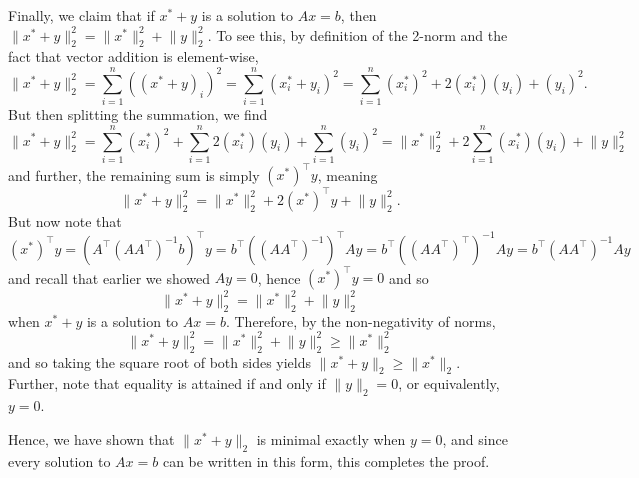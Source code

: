 \documentclass{../../../kin_math}
\begin{document}
\begin{questions}
\begin{solution}
    Finally, we claim that if $x^* + y$ is a solution to $Ax = b$, then $\lVert x^* + y \rVert_2^2 = \lVert x^* \rVert_2^2 + \lVert y \rVert_2^2$. To see this, by definition of the 2-norm and the fact that vector addition is element-wise,
    \begin{equation*}
      \lVert x^* + y \rVert_2^2 = \sum_{i = 1}^n ((x^* + y)_i)^2 = \sum_{i = 1}^n (x_i^* + y_i)^2 = \sum_{i = 1}^n (x_i^*)^2 + 2(x_i^*)(y_i) + (y_i)^2.
    \end{equation*}
    But then splitting the summation, we find
    \begin{equation*}
      \lVert x^* + y \rVert_2^2 = \sum_{i = 1}^n (x_i^*)^2 + \sum_{i = 1}^n 2(x_i^*)(y_i) + \sum_{i = 1}^n (y_i)^2 = \lVert x^* \rVert_2^2 + 2 \sum_{i = 1}^n (x_i^*)(y_i) + \lVert y \rVert_2^2
    \end{equation*}
    and further, the remaining sum is simply $(x^*)^\top y$, meaning
    \begin{equation*}
      \lVert x^* + y \rVert_2^2 = \lVert x^* \rVert_2^2 + 2(x^*)^\top y + \lVert y \rVert_2^2.
    \end{equation*}
    But now note that
    \begin{equation*}
      (x^*)^\top y = (A^\top (A A^\top)^{-1} b)^\top y = b^\top ((A A^\top)^{-1})^\top A y = b^\top ((A A^\top)^\top)^{-1} A y = b^\top (A A^\top)^{-1} A y
    \end{equation*}
    and recall that earlier we showed $Ay = 0$, hence $(x^*)^\top y = 0$ and so
    \begin{equation}
      \lVert x^* + y \rVert_2^2 = \lVert x^* \rVert_2^2 + \lVert y \rVert_2^2
    \end{equation}
    when $x^* + y$ is a solution to $Ax = b$. Therefore, by the non-negativity of norms,
    \begin{equation*}
      \label{eq:normineq}
      \lVert x^* + y \rVert_2^2 = \lVert x^* \rVert_2^2 + \lVert y \rVert_2^2 \geq \lVert x^* \rVert_2^2
    \end{equation*}
    and so taking the square root of both sides yields $\lVert x^* + y \rVert_2 \geq \lVert x^* \rVert_2$. Further, note that equality is attained if and only if $\lVert y \rVert_2 = 0$, or equivalently, $y = 0$.

    Hence, we have shown that $\lVert x^* + y \rVert_2$ is minimal exactly when $y = 0$, and since every solution to $Ax = b$ can be written in this form, this completes the proof.
  \end{solution}


\end{questions}
\end{document}
